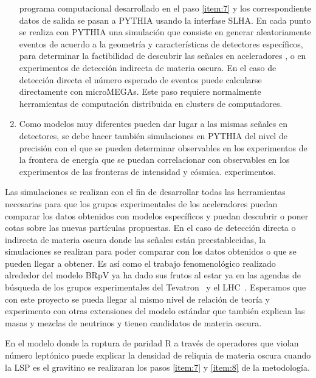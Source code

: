\begin{enumerate}
  programa computacional desarrollado en el paso \ref{item:7} y los
  correspondiente datos de salida se pasan a PYTHIA usando la
  interfase SLHA. En cada punto se realiza con PYTHIA una simulación
  que consiste en generar aleatoriamente eventos de acuerdo a la
  geometría y características de detectores específicos, para
  determinar la factibilidad de descubrir las señales en aceleradores
  \cite{Magro:2003zb,deCampos:2005ri,deCampos:2007bn,deCampos:2008ic,deCampos:2008re},
  o en experimentos de detección indirecta \cite{Choi:2010xn} de
  materia oscura. En el caso de detección directa el número esperado
  de eventos puede calcularse directamente con microMEGAs. Este paso
  requiere normalmente herramientas de computación distribuida en
  clusters de computadores.
  \label{item:8}
\item Como modelos muy diferentes pueden dar lugar a las mismas
  señales en detectores, se debe hacer también simulaciones en PYTHIA
  del nivel de precisión con el que se pueden determinar observables
  en los experimentos de la frontera de energía que se puedan
  correlacionar con observables en los experimentos de las fronteras
  de intensidad y cósmica.
  experimentos.
  \label{item:9}
\end{enumerate}

Las simulaciones se realizan con el fin de desarrollar todas las
herramientas necesarias para que los grupos experimentales de los
aceleradores puedan comparar los datos obtenidos con modelos
específicos y puedan descubrir o poner cotas sobre las nuevas
partículas propuestas. En el caso de detección directa o indirecta de
materia oscura donde las señales están preestablecidas, la
simulaciones se realizan para poder comparar con los datos obtenidos o
que se pueden llegar a obtener. Es así como el trabajo fenomenológico
realizado alrededor del modelo BRpV ya ha dado sus frutos al estar ya
en las agendas de búsqueda de los grupos experimentales del
Tevatron~\cite{Brigliadori:2008vf} y el LHC~\cite{:2011iu}. Esperamos
que con este proyecto se pueda llegar al mismo nivel de relación de
teoría y experimento con otras extensiones del modelo estándar que
también explican las masas y mezclas de neutrinos y tienen candidatos
de materia oscura.



\begin{gravitinodm}
  En el modelo donde la ruptura de paridad R a través de operadores
  que violan número leptónico puede explicar la densidad de reliquia
  de materia oscura cuando la LSP es el gravitino se realizaran los
  pasos \ref{item:7} y \ref{item:8} de la metodología.
\end{gravitinodm}

